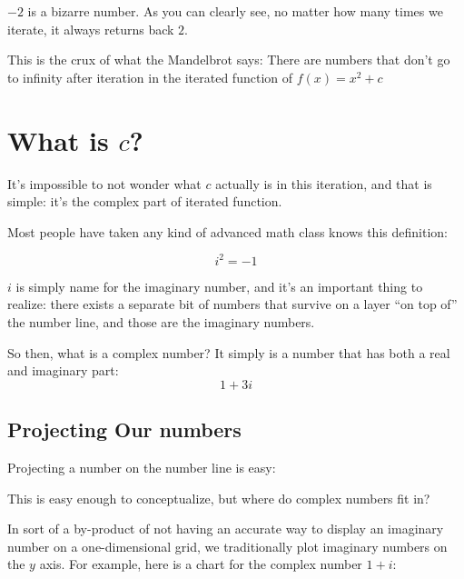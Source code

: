 \documentclass{article}
\begin{document}
$-2$ is a bizarre number.  As you can clearly see, no matter how many times we iterate, it always returns back $2$.

This is the crux of what the Mandelbrot says: There are numbers that don't go to infinity after iteration in the iterated function of $f(x) = x^2 + c$

\section{What is $c$?}
It's impossible to not wonder what $c$ actually is in this iteration, and that is simple: it's the complex part of iterated function.

Most people have taken any kind of advanced math class knows this definition:

$$ i^2 = -1$$

$i$ is simply name for the imaginary number, and it's an important thing to realize: there exists a separate bit of numbers that survive on a layer ``on top of'' the number line, and those are the imaginary numbers.

So then, what is a complex number?  It simply is a number that has both a real and imaginary part:
$$ 1 + 3i$$


\subsection{Projecting Our numbers}
Projecting a number on the number line is easy:



This is easy enough to conceptualize, but where do complex numbers fit in?

In sort of a by-product of not having an accurate way to display an imaginary number on a one-dimensional grid, we traditionally plot imaginary numbers on the $y$ axis. For example, here is a chart for the complex number $1 + i$:


\end{document}
